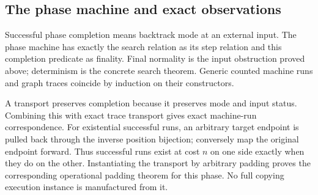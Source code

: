 




\subsection{The phase machine and exact observations}

Successful phase completion means backtrack mode at an external input. The
phase machine has exactly the search relation as its step relation and this
completion predicate as finality. Final normality is the input obstruction
proved above; determinism is the concrete search theorem. Generic counted
machine runs and graph traces coincide by induction on their constructors.

A transport preserves completion because it preserves mode and input status.
Combining this with exact trace transport gives exact machine-run correspondence.
For existential successful runs, an arbitrary target endpoint is pulled back
through the inverse position bijection; conversely map the original endpoint
forward. Thus successful runs exist at cost $n$ on one side exactly when they
do on the other. Instantiating the transport by arbitrary padding proves the
corresponding operational padding theorem for this phase. No full copying
execution instance is manufactured from it.








